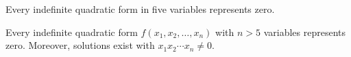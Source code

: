 \begin{proposition}
Every indefinite quadratic form in five variables represents zero.
\end{proposition}

\begin{proposition}
Every indefinite quadratic form $f(x_1,x_2,\ldots,x_n)$ with $n>5$ variables
represents zero. Moreover, solutions exist with $x_1x_2\cdots x_n\ne0$.
\end{proposition}
